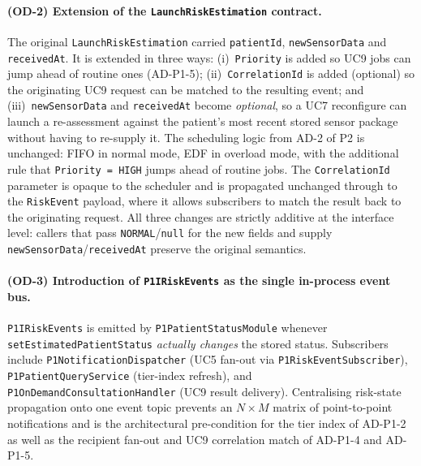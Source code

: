 \paragraph{(OD-2) Extension of the \texttt{LaunchRiskEstimation} contract.}
The original \texttt{LaunchRiskEstimation} carried \texttt{patientId},
\texttt{newSensorData} and \texttt{receivedAt}. It is extended in three
ways: (i)~\texttt{Priority} is added so UC9 jobs can jump ahead of
routine ones (AD-P1-5); (ii)~\texttt{CorrelationId} is added (optional)
so the originating UC9 request can be matched to the resulting event;
and (iii)~\texttt{newSensorData} and \texttt{receivedAt} become
\emph{optional}, so a UC7 reconfigure can launch a re-assessment
against the patient's most recent stored sensor package without having
to re-supply it. The scheduling logic from AD-2 of P2 is unchanged:
FIFO in normal mode, EDF in overload mode, with the additional rule
that \texttt{Priority = HIGH} jumps ahead of routine jobs. The
\texttt{CorrelationId} parameter is opaque to the scheduler and is
propagated unchanged through to the \texttt{RiskEvent} payload, where
it allows subscribers to match the result back to the originating
request. All three changes are strictly additive at the interface
level: callers that pass \texttt{NORMAL}/\texttt{null} for the new
fields and supply \texttt{newSensorData}/\texttt{receivedAt} preserve
the original semantics.

\paragraph{(OD-3) Introduction of \texttt{P1IRiskEvents} as the single
in-process event bus.}
\texttt{P1IRiskEvents} is emitted by \texttt{P1PatientStatusModule}
whenever \texttt{setEstimatedPatientStatus} \emph{actually changes} the
stored status. Subscribers include \texttt{P1NotificationDispatcher} (UC5
fan-out via \texttt{P1RiskEventSubscriber}),
\texttt{P1PatientQueryService} (tier-index refresh), and
\texttt{P1OnDemandConsultationHandler} (UC9 result delivery).
Centralising risk-state propagation onto one event topic prevents an
$N{\times}M$ matrix of point-to-point notifications and is the
architectural pre-condition for the tier index of AD-P1-2 as well as
the recipient fan-out and UC9 correlation match of AD-P1-4 and
AD-P1-5.

